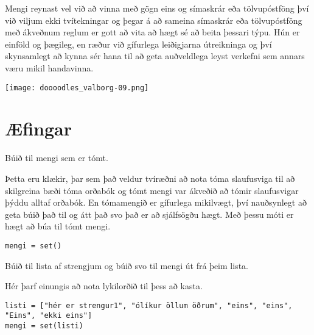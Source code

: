 Mengi reynast vel við að vinna með gögn eins og símaskrár eða tölvupóstföng því við viljum ekki tvítekningar og þegar á að sameina símaskrár eða tölvupóstföng með ákveðnum reglum er gott að vita að hægt sé að beita þessari týpu.
Hún er einföld og þægileg, en ræður við gífurlega leiðigjarna útreikninga og því skynsamlegt að kynna sér hana til að geta auðveldlega leyst verkefni sem annars væru mikil handavinna.

	\begin{center}
		\texttt{[image: doooodles\_valborg-09.png]}
	\end{center}

\newpage
\section{Æfingar}
\begin{exercise}\label{set1}
Búið til mengi sem er tómt.
\end{exercise}
\begin{Answer}[ref={set1}]
Þetta eru klækir, þar sem það veldur tvíræðni að nota tóma slaufusviga til að skilgreina bæði tóma orðabók og tómt mengi var ákveðið að tómir slaufusvigar þýddu alltaf orðabók.
En tómamengið er gífurlega mikilvægt, því nauðsynlegt að geta búið það til og átt það svo það er að sjálfsögðu hægt.
Með þessu móti er hægt að búa til tómt mengi.
	\begin{lstlisting}
mengi = set()
	\end{lstlisting}
\end{Answer}


\begin{exercise}\label{set2}
Búið til lista af strengjum og búið svo til mengi út frá þeim lista.
\end{exercise}
\begin{Answer}[ref={set2}]
	Hér þarf einungis að nota lykilorðið til þess að kasta.
	\begin{lstlisting}
listi = ["hér er strengur1", "ólíkur öllum öðrum", "eins", "eins", "Eins", "ekki eins"]
mengi = set(listi)\end{lstlisting}
\end{Answer}


